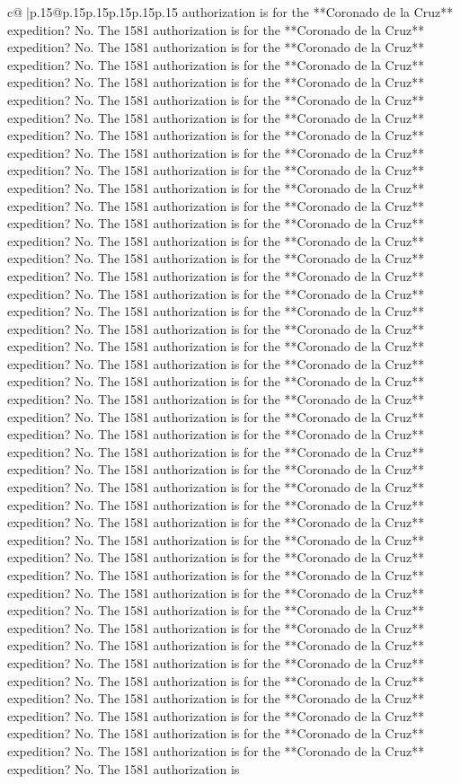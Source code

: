 \documentclass{article}
\begin{document}
{\begin{supertabular}{c@{$\;$}|p{.15\linewidth}@{}p{.15\linewidth}p{.15\linewidth}p{.15\linewidth}p{.15\linewidth}p{.15\linewidth}}
{{{authorization is for the **Coronado de la Cruz** expedition? No. The 1581 authorization is for the **Coronado de la Cruz** expedition? No. The 1581 authorization is for the **Coronado de la Cruz** expedition? No. The 1581 authorization is for the **Coronado de la Cruz** expedition? No. The 1581 authorization is for the **Coronado de la Cruz** expedition? No. The 1581 authorization is for the **Coronado de la Cruz** expedition? No. The 1581 authorization is for the **Coronado de la Cruz** expedition? No. The 1581 authorization is for the **Coronado de la Cruz** expedition? No. The 1581 authorization is for the **Coronado de la Cruz** expedition? No. The 1581 authorization is for the **Coronado de la Cruz** expedition? No. The 1581 authorization is for the **Coronado de la Cruz** expedition? No. The 1581 authorization is for the **Coronado de la Cruz** expedition? No. The 1581 authorization is for the **Coronado de la Cruz** expedition? No. The 1581 authorization is for the **Coronado de la Cruz** expedition? No. The 1581 authorization is for the **Coronado de la Cruz** expedition? No. The 1581 authorization is for the **Coronado de la Cruz** expedition? No. The 1581 authorization is for the **Coronado de la Cruz** expedition? No. The 1581 authorization is for the **Coronado de la Cruz** expedition? No. The 1581 authorization is for the **Coronado de la Cruz** expedition? No. The 1581 authorization is for the **Coronado de la Cruz** expedition? No. The 1581 authorization is for the **Coronado de la Cruz** expedition? No. The 1581 authorization is for the **Coronado de la Cruz** expedition? No. The 1581 authorization is for the **Coronado de la Cruz** expedition? No. The 1581 authorization is for the **Coronado de la Cruz** expedition? No. The 1581 authorization is for the **Coronado de la Cruz** expedition? No. The 1581 authorization is for the **Coronado de la Cruz** expedition? No. The 1581 authorization is for the **Coronado de la Cruz** expedition? No. The 1581 authorization is for the **Coronado de la Cruz** expedition? No. The 1581 authorization is for the **Coronado de la Cruz** expedition? No. The 1581 authorization is for the **Coronado de la Cruz** expedition? No. The 1581 authorization is for the **Coronado de la Cruz** expedition? No. The 1581 authorization is for the **Coronado de la Cruz** expedition? No. The 1581 authorization is for the **Coronado de la Cruz** expedition? No. The 1581 authorization is for the **Coronado de la Cruz** expedition? No. The 1581 authorization is for the **Coronado de la Cruz** expedition? No. The 1581 authorization is for the **Coronado de la Cruz** expedition? No. The 1581 authorization is for the **Coronado de la Cruz** expedition? No. The 1581 authorization is for the **Coronado de la Cruz** expedition? No. The 1581 authorization is for the **Coronado de la Cruz** expedition? No. The 1581 authorization is for the **Coronado de la Cruz** expedition? No. The 1581 authorization is for the **Coronado de la Cruz** expedition? No. The 1581 authorization is for the **Coronado de la Cruz** expedition? No. The 1581 authorization is for the **Coronado de la Cruz** expedition? No. The 1581 authorization is }}}
\end{supertabular}}
\end{document}
